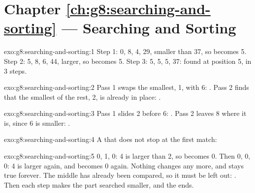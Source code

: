 \section*{Chapter \ref{ch:g8:searching-and-sorting} --- Searching and Sorting}

\begin{solution}{exo:g8:searching-and-sorting:1}
Step 1:  0,  8,  4,  29, smaller than
37, so  becomes 5. Step 2:  5,  8,
 6,  44, larger, so  becomes 5. Step 3:
 5,  5,  5,  37: found at position 5,
in 3 steps.
\end{solution}

\begin{solution}{exo:g8:searching-and-sorting:2}
Pass 1 swaps the smallest, 1, with 6: \code{[1, 2, 8, 5, 6]}. Pass 2 finds
that the smallest of the rest, 2, is already in place:
\code{[1, 2, 8, 5, 6]}.
\end{solution}

\begin{solution}{exo:g8:searching-and-sorting:3}
Pass 1 slides 2 before 6: \code{[2, 6, 8, 5, 1]}. Pass 2 leaves 8 where it
is, since 6 is smaller: \code{[2, 6, 8, 5, 1]}.
\end{solution}

\begin{solution}{exo:g8:searching-and-sorting:4}
A  that does not stop at the first match:

\label{lst:g8:searching-and-sorting:sol-all}
\end{solution}

\begin{solution}{exo:g8:searching-and-sorting:5}
 0,  1,  0: 4 is larger than 2, so
 becomes 0. Then  0,  0,  0: 4
is larger again, and  becomes 0 again. Nothing changes any more,
and  stays true forever. The middle  has already been
compared, so it must be left out: . Then each step
makes the part searched smaller, and the  ends.
\end{solution}

